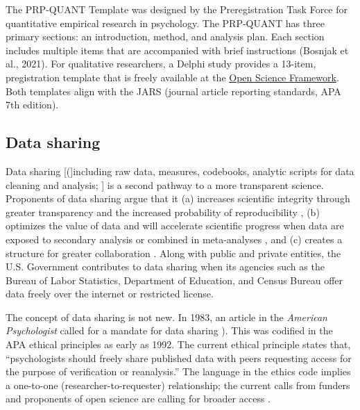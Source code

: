 \documentclass[
  11pt,
]{book}
\begin{document}
The PRP-QUANT Template was designed by the Preregistration Task Force \citeyearpar{preregistration_task_force_preregistration_2021} for quantitative empirical research in psychology. The PRP-QUANT has three primary sections: an introduction, method, and analysis plan. Each section includes multiple items that are accompanied with brief instructions \citep{bosnjak_template_2021} (Bosnjak et al., 2021). For qualitative researchers, a Delphi study provides a 13-item, pregistration template that is freely available at the \href{https://doi.org/10.31235/osf.io/pz9jr;\%20Haven\%20et\%20al.,\%202020}{Open Science Framework}. Both templates align with the JARS (journal article reporting standards, APA 7th edition).

\hypertarget{data-sharing}{%
\subsection{Data sharing}\label{data-sharing}}

Data sharing {[}({]}including raw data, measures, codebooks, analytic scripts for data cleaning and analysis; \citet{alter_responsible_2018}{]} is a second pathway to a more transparent science. Proponents of data sharing argue that it (a) increases scientific integrity through greater transparency and the increased probability of reproducibility \citep{martone_data_2018}, (b) optimizes the value of data and will accelerate scientific progress when data are exposed to secondary analysis or combined in meta-analyses \citep{ross_ethical_2018}, and (c) creates a structure for greater collaboration \citep{bezjak_open_2018}. Along with public and private entities, the U.S. Government contributes to data sharing when its agencies such as the Bureau of Labor Statistics, Department of Education, and Census Bureau offer data freely over the internet or restricted license.

The concept of data sharing is not new. In 1983, an article in the \emph{American Psychologist} called for a mandate for data sharing \citep{ceci_private_1983}). This was codified in the APA ethical principles as early as 1992. The current ethical principle \citep{american_psychological_association_ethical_2017} states that, ``psychologists should freely share published data with peers requesting access for the purpose of verification or reanalysis.'' The language in the ethics code implies a one-to-one (researcher-to-requester) relationship; the current calls from funders and proponents of open science are calling for broader access \citep{martone_data_2018}.
\end{document}
